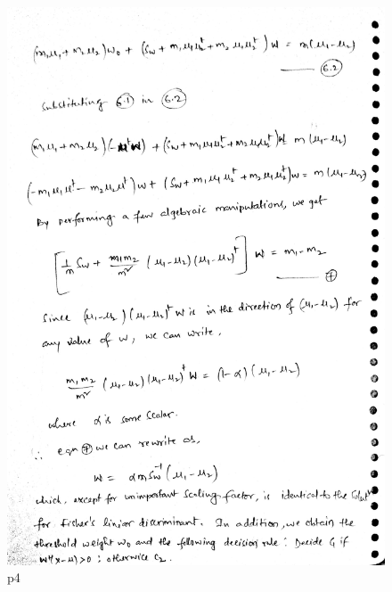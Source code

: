 \documentclass[10pt,a4paper]{article}
\begin{document}
\begin{figure}[!h]
\includegraphics[scale=0.03]{images/p4A2_4.jpg}	
  \caption{p4}
  \label{fig:C34T2}
\end{figure}
\end{document}
